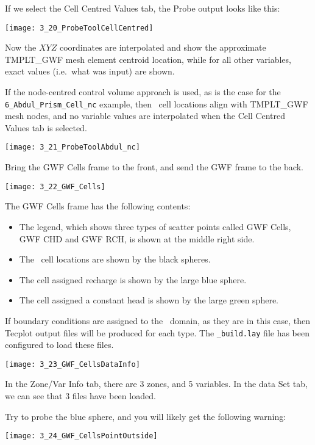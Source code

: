 If we select the {\sf Cell Centred Values} tab, the {\sf Probe} output looks like this:

        \texttt{[image: 3\_20\_ProbeToolCellCentred]}

Now the $XYZ$ coordinates are interpolated and show the approximate {\sf TMPLT\_GWF} mesh element centroid location, while for all other variables, exact values (i.e.\ what was input) are shown.

If the node-centred control volume approach is used, as is the case for the \texttt{6\_Abdul\_Prism\_Cell\_nc} example, then \mf\ cell locations align with {\sf TMPLT\_GWF} mesh nodes, and no variable values are interpolated when the {\sf Cell Centred Values} tab is selected.

        \texttt{[image: 3\_21\_ProbeToolAbdul\_nc]}

Bring the {\sf GWF Cells} frame to the front, and send the {\sf GWF} frame to the back.

        \texttt{[image: 3\_22\_GWF\_Cells]}


The {\sf GWF Cells} frame has the following contents:
\begin{itemize}
  \item The legend, which shows three types of scatter points called {\sf GWF Cells, GWF CHD} and {\sf GWF RCH}, is shown at the middle right side.
   \item The \mfus\ cell locations are shown by the black spheres.
   \item The cell assigned recharge is shown by the large blue sphere.
   \item The cell assigned a constant head is shown by the large green sphere.
\end{itemize}

If boundary conditions are assigned to the \gwf\ domain, as they are in this case, then Tecplot output files will be produced for each type.  The {\tt \_build.lay} file has been configured to load these files.

       \texttt{[image: 3\_23\_GWF\_CellsDataInfo]}

In the {\sf Zone/Var Info} tab, there are 3 zones, and 5 variables.  In the {\sf data Set} tab, we can see that 3 files have been loaded.  

Try to probe the blue sphere, and you will likely get the following warning:

       \texttt{[image: 3\_24\_GWF\_CellsPointOutside]}

